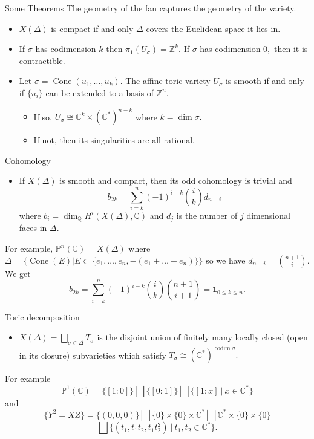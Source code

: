 \documentclass{beamer}
\newcommand{\C}{\mathbb{C}}
\newcommand{\Z}{\mathbb{Z}}
\newcommand{\Proj}{\mathbb{P}}
\DeclareMathOperator{\Cone}{Cone}
\begin{document}
\begin{frame}{Some Theorems}
 The geometry of the fan captures the geometry of the variety.

\begin{itemize}
 \item $X(\Delta)$ is compact if and only $\Delta$ covers the Euclidean space it lies in. 
\item If $\sigma$ has codimension $k$ then $\pi_1(U_{\sigma}) = \Z^k.$ If $\sigma$ has codimension $0,$ then it is contractible. 
 \item Let $\sigma = \Cone(u_1,\ldots, u_k).$ The affine toric variety $U_{\sigma}$ is smooth if and only if $\{ u_i\}$ can be extended to a basis of $\Z^n.$ \begin{itemize}
	  \item If so, $U_{\sigma} \cong \C^k \times (\C^*)^{n-k}$ where $k=\dim \sigma.$
	  \item If not, then its singularities are all rational. 	
	  \end{itemize}




\end{itemize}

\end{frame}
\begin{frame}{Cohomology}
 \begin{itemize}
  \item If $X(\Delta)$ is smooth and compact, then its odd cohomology is trivial and $$b_{2k} = \sum_{i=k}^n (-1)^{i-k} \binom{i}{k} d_{n-i}$$ where $b_i = \dim_{\mathbb{Q}} H^i(X(\Delta), \mathbb{Q} )$ and $d_j$ is the number of $j$ dimensional faces in $\Delta.$ 

 \end{itemize}

For example, $\Proj^n(\C)= X(\Delta)$ where $\Delta = \{ \Cone(E) | E\subset \{ e_1,\ldots, e_n, -(e_1+\ldots+e_n) \} \}$ so we have $d_{n-i}=\binom{n+1}{i}.$ We get $$b_{2k}=\sum_{i=k}^n (-1)^{i-k} \binom{i}{k} \binom{n+1}{i+1} =\mathbf{1}_{0\leq k \leq n}.$$


\end{frame}


\begin{frame}{Toric decomposition}
 \begin{itemize}
  \item $X(\Delta) = \bigsqcup_{\sigma\in \Delta} T_{\sigma}$ is the disjoint union of finitely many locally closed (open in its closure) subvarieties which satisfy $T_{\sigma} \cong (\C^*)^{\operatorname{codim} \sigma}.$ 
 \end{itemize}
For example $$\Proj^1(\C) = \{ [1:0] \} \bigsqcup \{ [0:1] \} \bigsqcup \{ [1:x] \ | \ x\in \C^* \}$$ and $$ \{ Y^2=XZ \} = \{ (0,0,0) \} \bigsqcup \{0\} \times \{ 0 \} \times \C^* \bigsqcup \C^* \times \{ 0 \} \times \{ 0 \}$$ $$ \bigsqcup \{ (t_1,t_1t_2,t_1t_2^2) \ | \ t_1,t_2 \in \C^* \}.$$
\end{frame}
\end{document}
